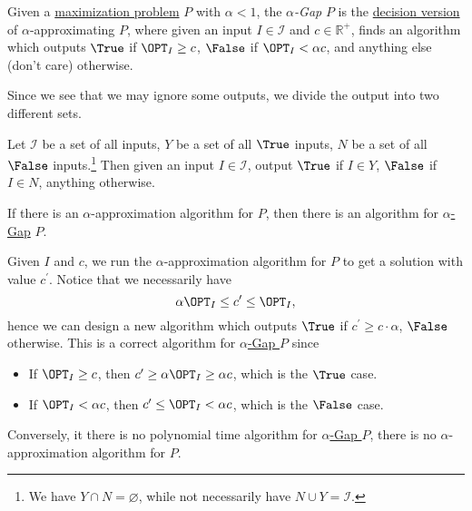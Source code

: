 \begin{definition}\label{def:Gap}
	Given a \hyperref[def:combinatorial-optimization]{maximization problem} \(P\) with \(\alpha < 1\), the \emph{\(\alpha \)-Gap} \(P\) is the \hyperref[def:decision-P]{decision version} of \(\alpha\)-approximating \(P\), where given an input \(I\in \mathcal{I} \) and \(c\in \mathbb{R} ^+\), finds an algorithm which outputs \(\True\) if \(\OPT_I \geq c\), \(\False\) if \(\OPT_I < \alpha c\), and anything else (don't care) otherwise.
\end{definition}

Since we see that we may ignore some outputs, we divide the output into two different sets.

\begin{notation}
	Let \(\mathcal{I} \) be a set of all inputs, \(Y\) be a set of all \(\True\) inputs, \(N\) be a set of all \(\False\) inputs.\footnote{We have \(Y \cap N = \varnothing \), while not necessarily have \(N \cup Y = \mathcal{I} \).} Then given an input \(I\in \mathcal{I} \), output \(\True\) if \(I\in Y\), \(\False\) if \(I\in N\), anything otherwise.
\end{notation}

\begin{remark}
	If there is an \(\alpha \)-approximation algorithm for \(P\), then there is an algorithm for \hyperref[def:Gap]{\(\alpha\)-Gap} \(P\).
\end{remark}
\begin{explanation}
	Given \(I\) and \(c\), we run the \(\alpha \)-approximation algorithm for \(P\) to get a solution with value \(c^\prime \). Notice that we necessarily have
	\[
		\alpha \OPT_I \leq c^\prime \leq \OPT_I,
	\]
	hence we can design a new algorithm which outputs \(\True\) if \(c^\prime \geq c \cdot \alpha \), \(\False\) otherwise. This is a correct algorithm for \hyperref[def:Gap]{\(\alpha \)-Gap \(P\)} since
	\begin{itemize}
		\item If \(\OPT_I \geq c\), then \(c^\prime \geq \alpha \OPT_I \geq \alpha c\), which is the \(\True\) case.
		\item If \(\OPT_I < \alpha c\), then \(c^\prime \leq \OPT_I < \alpha c\), which is the \(\False\) case.
	\end{itemize}

	Conversely, it there is no polynomial time algorithm for \hyperref[def:Gap]{\(\alpha \)-Gap \(P\)}, there is no \(\alpha \)-approximation algorithm for \(P\).
\end{explanation}

